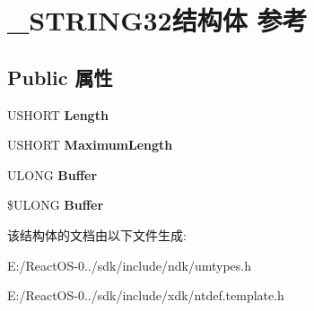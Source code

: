 \hypertarget{struct___s_t_r_i_n_g32}{}\section{\+\_\+\+S\+T\+R\+I\+N\+G32结构体 参考}
\label{struct___s_t_r_i_n_g32}
\subsection*{Public 属性}
\begin{DoxyCompactItemize}
\item 
\mbox{\label{struct___s_t_r_i_n_g32_aad5de12d51126ab030ee8906ff6aa6d6}} 
U\+S\+H\+O\+RT {\bfseries Length}
\item 
\mbox{\label{struct___s_t_r_i_n_g32_a12f42c525c72c96b61735a021106c420}} 
U\+S\+H\+O\+RT {\bfseries Maximum\+Length}
\item 
\mbox{\label{struct___s_t_r_i_n_g32_a16502990d721876d644e723e9e604d59}} 
U\+L\+O\+NG {\bfseries Buffer}
\item 
\mbox{\label{struct___s_t_r_i_n_g32_a9779a4ad514e0cd798656abd37c58e89}} 
\$U\+L\+O\+NG {\bfseries Buffer}
\end{DoxyCompactItemize}


该结构体的文档由以下文件生成\+:\begin{DoxyCompactItemize}
\item 
E\+:/\+React\+O\+S-\/0../sdk/include/ndk/umtypes.\+h\item 
E\+:/\+React\+O\+S-\/0../sdk/include/xdk/ntdef.\+template.\+h\end{DoxyCompactItemize}
